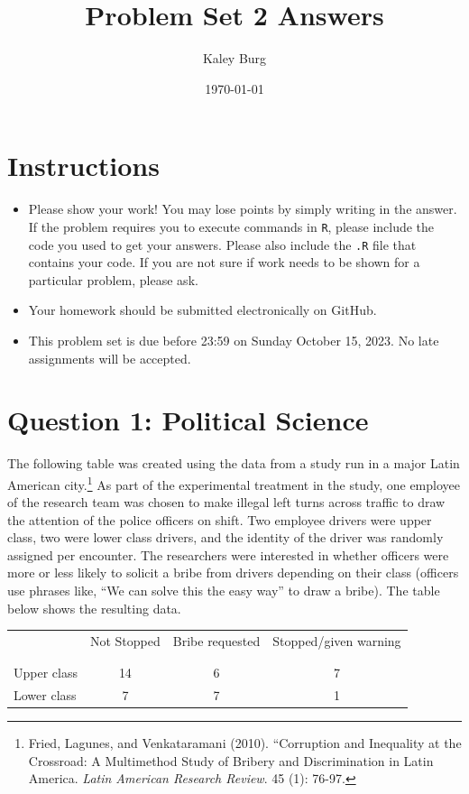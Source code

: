 \documentclass[12pt,letterpaper]{article}
\title{Problem Set 2 Answers}
\date{\today}
\author{Kaley Burg}
\begin{document}
	\maketitle
	\section*{Instructions}
\begin{itemize}
	\item Please show your work! You may lose points by simply writing in the answer. If the problem requires you to execute commands in \texttt{R}, please include the code you used to get your answers. Please also include the \texttt{.R} file that contains your code. If you are not sure if work needs to be shown for a particular problem, please ask.
	\item Your homework should be submitted electronically on GitHub.
	\item This problem set is due before 23:59 on Sunday October 15, 2023. No late assignments will be accepted.

\end{itemize}

	
	\vspace{.5cm}
	\section*{Question 1: Political Science}
		\vspace{.25cm}
	The following table was created using the data from a study run in a major Latin American city.\footnote{Fried, Lagunes, and Venkataramani (2010). ``Corruption and Inequality at the Crossroad: A Multimethod Study of Bribery and Discrimination in Latin America. \textit{Latin American Research Review}. 45 (1): 76-97.} As part of the experimental treatment in the study, one employee of the research team was chosen to make illegal left turns across traffic to draw the attention of the police officers on shift. Two employee drivers were upper class, two were lower class drivers, and the identity of the driver was randomly assigned per encounter. The researchers were interested in whether officers were more or less likely to solicit a bribe from drivers depending on their class (officers use phrases like, ``We can solve this the easy way'' to draw a bribe). The table below shows the resulting data.

\newpage
\begin{table}[h!]
	\centering
	\begin{tabular}{l | c c c }
		& Not Stopped & Bribe requested & Stopped/given warning \\
		\\[-1.8ex] 
		\hline \\[-1.8ex]
		Upper class & 14 & 6 & 7 \\
		Lower class & 7 & 7 & 1 \\
		\hline
	\end{tabular}
\end{table}
\end{document}
